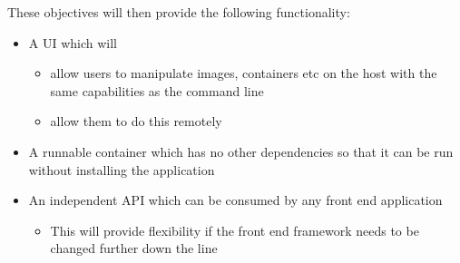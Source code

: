 These objectives will then provide the following functionality:

\begin{itemize}
	\item A UI which will 
	\begin{itemize}
		\item allow users to manipulate images, containers etc on the host with the same capabilities as the command line
		\item allow them to do this remotely
	\end{itemize}
	\item A runnable container which has no other dependencies so that it can be run without installing the application
	\item An independent API which can be consumed by any front end application
	\begin{itemize}
		\item This will provide flexibility if the front end framework needs to be changed further down the line
	\end{itemize}
\end{itemize}
